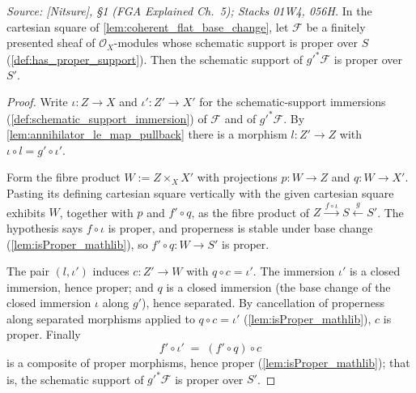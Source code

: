 \begin{lemma}\leanok
  \label{lem:proper_support_base_change}
  \textit{Source: [Nitsure], \S 1 (FGA Explained Ch.~5); Stacks 01W4, 056H.}
  In the cartesian square of \cref{lem:coherent_flat_base_change}, let
  \(\mathcal{F}\) be a finitely presented sheaf of
  \(\mathcal{O}_X\)-modules whose schematic support is proper over \(S\)
  (\cref{def:has_proper_support}).  Then the schematic support of
  \(g'^* \mathcal{F}\) is proper over \(S'\).
\end{lemma}
\begin{proof}\leanok
  Write \(\iota : Z \to X\) and \(\iota' : Z' \to X'\) for the
  schematic-support immersions (\cref{def:schematic_support_immersion}) of
  \(\mathcal{F}\) and of \(g'^* \mathcal{F}\).  By
  \cref{lem:annihilator_le_map_pullback} there is a morphism
  \(l : Z' \to Z\) with \(\iota \circ l = g' \circ \iota'\).

  Form the fibre product \(W := Z \times_X X'\) with projections
  \(p : W \to Z\) and \(q : W \to X'\).  Pasting its defining cartesian
  square vertically with the given cartesian square exhibits \(W\), together
  with \(p\) and \(f' \circ q\), as the fibre product of
  \(Z \xrightarrow{\,f \circ \iota\,} S \xleftarrow{\,g\,} S'\).  The
  hypothesis says \(f \circ \iota\) is proper, and properness is stable under
  base change (\cref{lem:isProper_mathlib}), so \(f' \circ q : W \to S'\) is
  proper.

  The pair \((l, \iota')\) induces \(c : Z' \to W\) with
  \(q \circ c = \iota'\).  The immersion \(\iota'\) is a closed immersion,
  hence proper; and \(q\) is a closed immersion (the base change of the
  closed immersion \(\iota\) along \(g'\)), hence separated.  By cancellation
  of properness along separated morphisms applied to \(q \circ c = \iota'\)
  (\cref{lem:isProper_mathlib}), \(c\) is proper.  Finally
  \[
    f' \circ \iota' \;=\; (f' \circ q) \circ c
  \]
  is a composite of proper morphisms, hence proper
  (\cref{lem:isProper_mathlib}); that is, the schematic support of
  \(g'^* \mathcal{F}\) is proper over \(S'\).
\end{proof}

